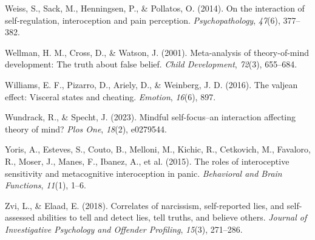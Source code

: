 \documentclass[
  man,mask,floatsintext]{apa6}
\newlength{\cslhangindent}
\newlength{\cslentryspacingunit} %
\newenvironment{CSLReferences}[2] %
 {%
  \setlength{\parindent}{0pt}
  \ifodd #1
  \let\oldpar\par
  \def\par{\hangindent=\cslhangindent\oldpar}
  \fi
  \setlength{\parskip}{#2\cslentryspacingunit}
 }%
 {}
\begin{document}
\begin{CSLReferences}{1}{0}
\leavevmode{}%
Weiss, S., Sack, M., Henningsen, P., \& Pollatos, O. (2014). On the interaction of self-regulation, interoception and pain perception. \emph{Psychopathology}, \emph{47}(6), 377--382.

\leavevmode{}%
Wellman, H. M., Cross, D., \& Watson, J. (2001). Meta-analysis of theory-of-mind development: The truth about false belief. \emph{Child Development}, \emph{72}(3), 655--684.

\leavevmode{}%
Williams, E. F., Pizarro, D., Ariely, D., \& Weinberg, J. D. (2016). The valjean effect: Visceral states and cheating. \emph{Emotion}, \emph{16}(6), 897.

\leavevmode{}%
Wundrack, R., \& Specht, J. (2023). Mindful self-focus--an interaction affecting theory of mind? \emph{Plos One}, \emph{18}(2), e0279544.

\leavevmode{}%
Yoris, A., Esteves, S., Couto, B., Melloni, M., Kichic, R., Cetkovich, M., Favaloro, R., Moser, J., Manes, F., Ibanez, A., et al. (2015). The roles of interoceptive sensitivity and metacognitive interoception in panic. \emph{Behavioral and Brain Functions}, \emph{11}(1), 1--6.

\leavevmode{}%
Zvi, L., \& Elaad, E. (2018). Correlates of narcissism, self-reported lies, and self-assessed abilities to tell and detect lies, tell truths, and believe others. \emph{Journal of Investigative Psychology and Offender Profiling}, \emph{15}(3), 271--286.

\end{CSLReferences}

\endgroup
\end{document}
